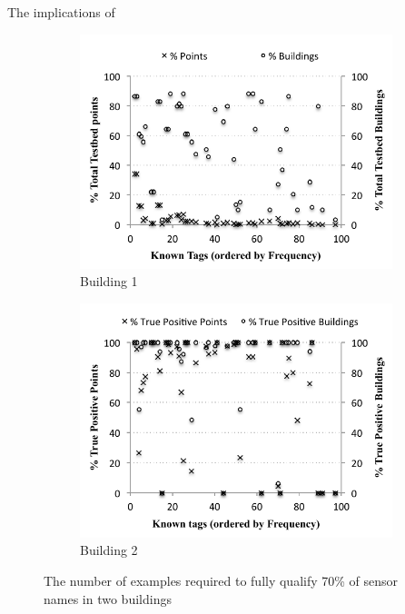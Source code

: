 The implications of 
 

\begin{figure}[h!]
\centering
	\begin{subfigure}{0.48\textwidth}
                \centering
		\includegraphics[width=\textwidth]{./figs/campusWideStats.pdf}
                \caption{Building 1}
                \label{fig:campusWideStats}
	\end{subfigure}
	\begin{subfigure}{0.48\textwidth}
                \centering
		\includegraphics[width=\textwidth]{./figs/recallCampusWide.pdf}
                \caption{Building 2}
                \label{fig:recallCampusWide}
	\end{subfigure}
\caption{The number of examples required to fully qualify 70\% of sensor names in two buildings}
\label{fig:active-learning}
\end{figure}






